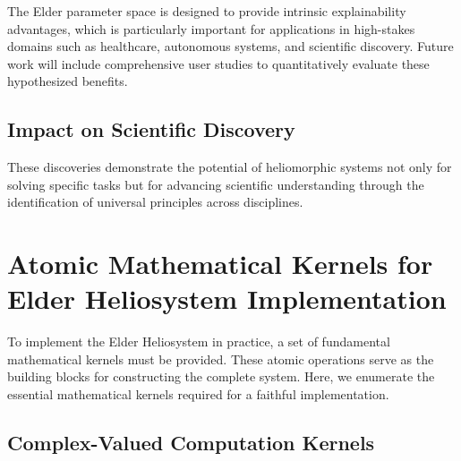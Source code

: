 The Elder parameter space is designed to provide intrinsic explainability advantages, which is particularly important for applications in high-stakes domains such as healthcare, autonomous systems, and scientific discovery. Future work will include comprehensive user studies to quantitatively evaluate these hypothesized benefits.

\subsection{Impact on Scientific Discovery}

These discoveries demonstrate the potential of heliomorphic systems not only for solving specific tasks but for advancing scientific understanding through the identification of universal principles across disciplines.

\section{Atomic Mathematical Kernels for Elder Heliosystem Implementation}

To implement the Elder Heliosystem in practice, a set of fundamental mathematical kernels must be provided. These atomic operations serve as the building blocks for constructing the complete system. Here, we enumerate the essential mathematical kernels required for a faithful implementation.

\subsection{Complex-Valued Computation Kernels}

